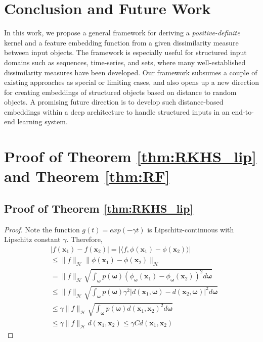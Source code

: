 \documentclass{article}
\newcommand{\1}{\mathbf{1}}
\newcommand{\bx}{\boldsymbol{x}}
\newcommand{\bomega}{\boldsymbol{\omega}}
\newcommand{\cH}{\mathcal{H}}
\begin{document}
\section{Conclusion and Future Work}
In this work, we propose a general framework for deriving a \emph{positive-definite} kernel and a feature embedding function from a given dissimilarity measure between input objects. The framework is especially useful for structured input domains such as sequences, time-series, and sets, where many well-established dissimilarity measures have been developed. Our framework subsumes a couple of existing approaches as special or limiting cases, and also opens up a new direction for creating embeddings of structured objects based on distance to random objects. A promising future direction is to develop such distance-based embeddings within a deep architecture to handle structured inputs in an end-to-end learning system.


\clearpage




\clearpage
\appendix

\section{Proof of Theorem \ref{thm:RKHS_lip} and Theorem \ref{thm:RF}}

\subsection{Proof of Theorem \ref{thm:RKHS_lip}}

\begin{proof}
Note the function $g(t)=exp(-\gamma t)$ is Lipschitz-continuous with Lipschitz constant $\gamma$. Therefore,
\begin{align*}
&|f(\bx_1)-f(\bx_2)|=|\langle f, \phi(\bx_1)-\phi(\bx_2)\rangle|\\
&\leq \|f\|_{\cH} \|\phi(\bx_1)-\phi(\bx_2)\|_{\cH}\\
&= \|f\|_{\cH} \sqrt{ \int_{\bomega} p(\bomega) ( \phi_{\bomega}(\bx_1)-\phi_{\bomega}(\bx_2))^2 d\bomega  }\\
&\leq  \|f\|_{\cH} \sqrt{ \int_{\bomega} p(\bomega) \gamma^2 |d(\bx_1,\bomega)-d(\bx_2,\bomega)|^2 d\bomega  }\\
&\leq \gamma \|f\|_{\cH}  \sqrt{ \int_{\bomega} p(\bomega)  d(\bx_1,\bx_2)^2 d\bomega  }\\
&\leq \gamma  \|f\|_{\cH}  d(\bx_1,\bx_2)\leq \gamma  C  d(\bx_1,\bx_2)
\end{align*}
\end{proof}
\end{document}
